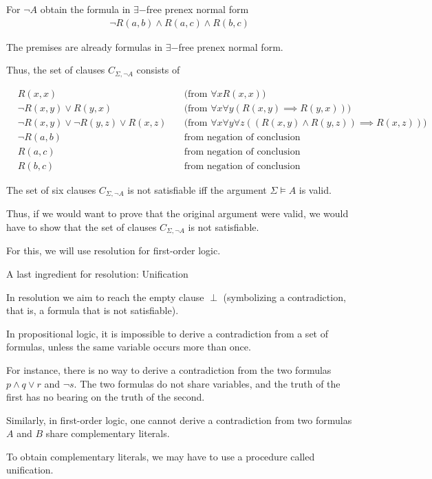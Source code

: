 \documentclass{article}
\begin{document}
For $\neg A$ obtain the formula in $\exists-$free prenex normal form
\begin{align*}
\neg R(a,b) \wedge R(a,c) \wedge R(b,c)
\end{align*}

The premises are already formulas in $\exists-$free prenex normal form.

Thus, the set of clauses $C_{\Sigma, \neg A}$ consists of

\begin{align*}
&R(x,x) \quad &\text{(from } \forall xR(x,x)) \\
&\neg R(x,y) \vee R(y,x) \quad &\text{(from } \forall x \forall y (R(x,y) \implies R(y,x))) \\
&\neg R(x,y) \vee \neg R(y,z) \vee R(x,z) \quad &\text{(from } \forall x \forall y \forall z ((R(x,y) \wedge R(y,z)) \implies R(x,z))) \\
&\neg R(a,b) \quad &\text{from negation of conclusion} \\
&R(a,c) \quad &\text{from negation of conclusion} \\
&R(b,c) \quad &\text{from negation of conclusion}
\end{align*}

The set of six clauses $C_{\Sigma, \neg A}$ is not satisfiable iff the argument $\Sigma \vDash A $ is valid.

Thus, if we would want to prove that the original argument were valid, we would have to show that the set of clauses $C_{\Sigma, \neg A}$ is not satisfiable.

For this, we will use resolution for first-order logic.


A last ingredient for resolution: Unification

In resolution we aim to reach the empty clause $\perp$ (symbolizing a contradiction, that is, a formula that is not satisfiable).

In propositional logic, it is impossible to derive a contradiction from a set of formulas, unless the same variable occurs more than once.

For instance, there is no way to derive a contradiction from the two formulas $p \wedge q \vee r$ and $\neg s$. The two formulas do not share variables, and the truth of the first has no bearing on the truth of the second.

Similarly, in first-order logic, one cannot derive a contradiction from two formulas $A$ and $B$ share complementary literals. 

To obtain complementary literals, we may have to use a procedure called unification.
\end{document}

